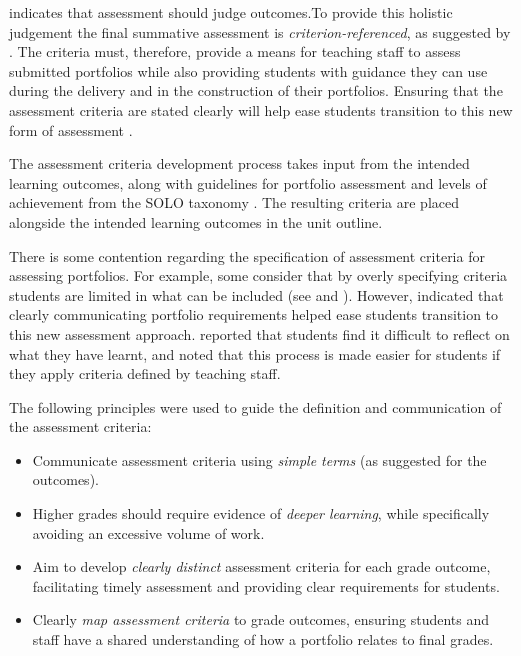  indicates that assessment should judge outcomes.To provide this holistic judgement the final summative assessment is \emph{criterion-referenced}, as suggested by \citet{Biggs:1997}. The criteria must, therefore, provide a means for teaching staff to assess submitted portfolios while also providing students with guidance they can use during the delivery and in the construction of their portfolios. Ensuring that the assessment criteria are stated clearly will help ease students transition to this new form of assessment \cite{Smith:2001}.

The assessment criteria development process takes input from the intended learning outcomes, along with guidelines for portfolio assessment \cite{Biggs:2007} and levels of achievement from the SOLO taxonomy \cite{Biggs:1982}. The resulting criteria are placed alongside the intended learning outcomes in the unit outline.

There is some contention regarding the specification of assessment criteria for assessing portfolios. For example, some consider that by overly specifying criteria students are limited in what can be included (see \citet{Driessen:2005} and \citet{Tigelaar:2007}). 
However, \citet{Smith:2001} indicated that clearly communicating portfolio requirements helped ease students transition to this new assessment approach. \citet{Thorpe:2000} reported that students find it difficult to reflect on what they have learnt, and noted that this process is made easier for students if they apply criteria defined by teaching staff.

The following principles were used to guide the definition and communication of the assessment criteria:

\begin{itemize}[noitemsep,nolistsep]
  \item Communicate assessment criteria using \emph{simple terms} (as suggested for the outcomes).
  \item Higher grades should require evidence of \emph{deeper learning}, while specifically avoiding an excessive volume of work.
  \item Aim to develop \emph{clearly distinct} assessment criteria for each grade outcome, facilitating timely assessment and providing clear requirements for students.  
  \item Clearly \emph{map assessment criteria} to grade outcomes, ensuring students and staff have a shared understanding of how a portfolio relates to final grades.
\end{itemize}



